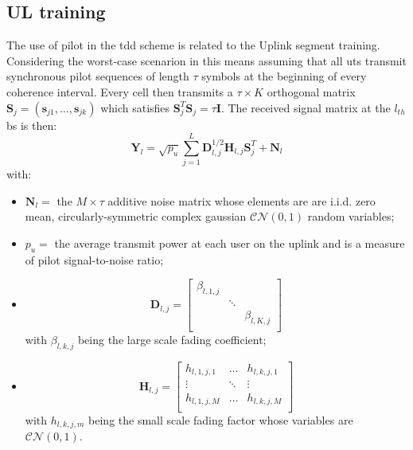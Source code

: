 \documentclass[11pt]{book}
\begin{document}
\subsection{UL training}
The use of pilot in the \gls{tdd} scheme is related to the Uplink segment training. Considering the worst-case scenarion in this means assuming that all \gls{ut}s transmit synchronous pilot sequences of length $\tau$ symbols at the beginning of every coherence interval. Every cell then transmits a $\tau \times K$ orthogonal matrix $\textbf{S}_j = (\textbf{s}_{j1},\dots,\textbf{s}_{jk})$ which satisfies $\textbf{S}_j^T\textbf{S}_j = \tau \textbf{I}$. The received signal matrix at the $l_{th}$ \gls{bs} is then:
\begin{equation}
\textbf{Y}_l = \sqrt{p_u}\sum_{j=1}^{L}\textbf{D}_{l,j}^{1/2}\textbf{H}_{l,j}\textbf{S}_j^T + \textbf{N}_l
\label{eq:recSignal}
\end{equation}
with:
\begin{itemize}
  \item $\textbf{N}_l = $ the $M \times \tau$ additive noise matrix whose elements are are i.i.d. zero mean, circularly-symmetric complex gaussian $\mathcal{CN}(0,1)$ random variables;\\
  \item $p_u = $ the average transmit power at each user on the uplink and is a measure of pilot signal-to-noise ratio;\\
  \item
  \begin{equation}
    \textbf{D}_{l,j} =
    \begin{bmatrix}
      \beta_{l,1,j} &        &              \\
                    & \ddots &              \\
                    &        & \beta_{l,K,j}\\
    \end{bmatrix}
  \end{equation}
  with $\beta_{l,k,j}$ being the large scale fading coefficient;\\
  \item
  \begin{equation}
    \textbf{H}_{l,j} =
    \begin{bmatrix}
      h_{l,1,j,1} & \dots  & h_{l,k,j,1}\\
      \vdots      & \ddots & \vdots\\
      h_{l,1,j,M} & \dots & h_{l,k,j,M}\\
    \end{bmatrix}
  \end{equation}
  with $h_{l,k,j,m}$ being the small scale fading factor whose variables are $\mathcal{CN}(0,1)$.\\
\end{itemize}
\end{document}
